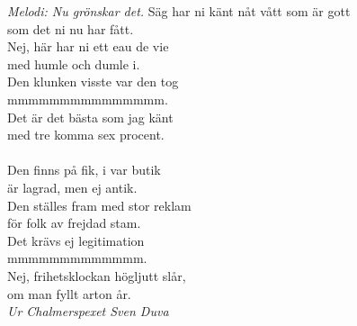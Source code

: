 {\footnotesize\textit{Melodi: Nu grönskar det.}}
\vspace{10pt}
Säg har ni känt nåt vått som är gott\\
som det ni nu har fått.\\
Nej, här har ni ett eau de vie\\
med humle och dumle i.\\
Den klunken visste var den tog\\
mmmmmmmmmmmmmmm.\\
Det är det bästa som jag känt\\
med tre komma sex procent.\\
\\
Den finns på fik, i var butik\\
är lagrad, men ej antik.\\
Den ställes fram med stor reklam\\
för folk av frejdad stam.\\
Det krävs ej legitimation\\
mmmmmmmmmmmmm.\\
Nej, frihetsklockan högljutt slår,\\
om man fyllt arton år.\\
\vspace{10pt}
{\footnotesize\textit{Ur Chalmerspexet Sven Duva}}
